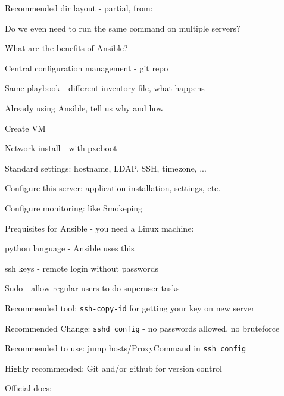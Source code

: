 \documentclass[18pt,landscape,a4paper,footrule]{foils}
\begin{document}
Recommended dir layout - partial, from:\\


Do we even need to run the same command on multiple servers?

What are the benefits of Ansible?
\begin{list2}
\item Central configuration management - git repo
\item Same playbook - different inventory file, what happens
\item Already using Ansible, tell us why and how
\end{list2}


\begin{list2}
\item Create VM
\item Network install - with pxeboot
\item Standard settings: hostname, LDAP, SSH, timezone,  ...
\item Configure this server: application installation, settings, etc.
\item Configure monitoring: like Smokeping
\end{list2}



Prequisites for Ansible - you need a Linux machine:
\begin{list2}
\item python language - Ansible uses this
\item ssh keys - remote login without passwords
\item Sudo - allow regular users to do superuser tasks
\item Recommended tool: \verb+ssh-copy-id+ for getting your key on new server
\item Recommended Change: \verb+sshd_config+ - no passwords allowed, no bruteforce
\item Recommended to use: jump hosts/ProxyCommand in \verb+ssh_config+
\item Highly recommended: Git and/or github for version control
\end{list2}

Official docs:
\end{document}
